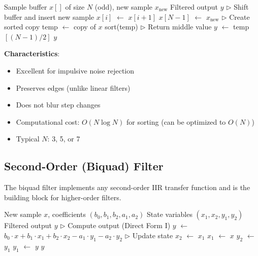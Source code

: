 \begin{algorithm}[htbp]
\caption{Median Filter}
\label{alg:median}
\begin{algorithmic}
\REQUIRE Sample buffer $x[]$ of size $N$ (odd), new sample $x_{\text{new}}$
\ENSURE Filtered output $y$
\STATE $\triangleright$ Shift buffer and insert new sample
    \STATE $x[i]$ $\leftarrow$ $x[i+1]$
\ENDFOR
\STATE $x[N-1]$ $\leftarrow$ $x_{\text{new}}$
\STATE $\triangleright$ Create sorted copy
\STATE temp $\leftarrow$ copy of $x$
\STATE sort(temp)
\STATE $\triangleright$ Return middle value
\STATE $y$ $\leftarrow$ temp$[(N-1)/2]$
\RETURN $y$
\end{algorithmic}
\end{algorithm}

\textbf{Characteristics}:
\begin{itemize}
    \item Excellent for impulsive noise rejection
    \item Preserves edges (unlike linear filters)
    \item Does not blur step changes
    \item Computational cost: $O(N \log N)$ for sorting (can be optimized to $O(N)$)
    \item Typical $N$: 3, 5, or 7
\end{itemize}

\subsection{Second-Order (Biquad) Filter}

The biquad filter implements any second-order IIR transfer function and is the building block for higher-order filters.

\begin{algorithm}[htbp]
\caption{Biquad (Second-Order IIR) Filter}
\label{alg:biquad}
\begin{algorithmic}
\REQUIRE New sample $x$, coefficients $(b_0, b_1, b_2, a_1, a_2)$
\REQUIRE State variables $(x_1, x_2, y_1, y_2)$ 
\ENSURE Filtered output $y$
\STATE $\triangleright$ Compute output (Direct Form I)
\STATE $y$ $\leftarrow$ $b_0 \cdot x + b_1 \cdot x_1 + b_2 \cdot x_2 - a_1 \cdot y_1 - a_2 \cdot y_2$
\STATE $\triangleright$ Update state
\STATE $x_2$ $\leftarrow$ $x_1$
\STATE $x_1$ $\leftarrow$ $x$
\STATE $y_2$ $\leftarrow$ $y_1$
\STATE $y_1$ $\leftarrow$ $y$
\RETURN $y$
\end{algorithmic}
\end{algorithm}

